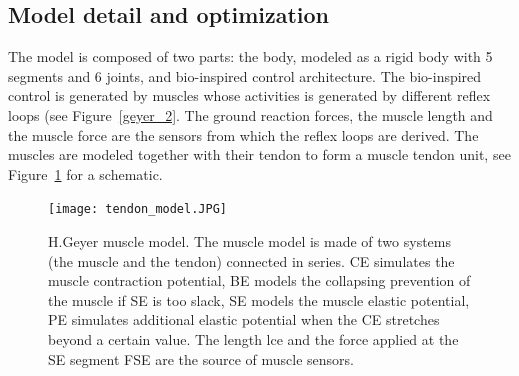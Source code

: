 \documentclass[a4paper,12pt]{article}
\begin{document}
\subsection{Model detail and optimization}

The model is composed of two parts: the body, modeled as a rigid body with 5 segments and 6 joints, and bio-inspired control architecture. The bio-inspired control is generated by muscles whose activities is generated by different reflex loops (see Figure~\ref{geyer_2}. The ground reaction forces, the muscle length and the muscle force are the sensors from which the reflex loops are derived. 
\medbreak
The muscles are modeled together with their tendon to form a muscle tendon unit, see Figure~\ref{muscletendonmodel} for a schematic. 


\begin{figure}[H]
	\centering
    \label{muscletendonmodel}
	\texttt{[image: tendon\_model.JPG]}
    \caption{ H.Geyer muscle model. The muscle model is made of two systems (the muscle and the tendon) connected in series. CE simulates the muscle contraction potential, BE models the collapsing prevention of the muscle if SE is too slack, SE models the muscle elastic potential, PE simulates additional elastic potential when the CE stretches beyond a certain value. 
    The length lce and the force applied at the SE segment FSE are the source of muscle sensors.}
\end{figure}
\end{document}
